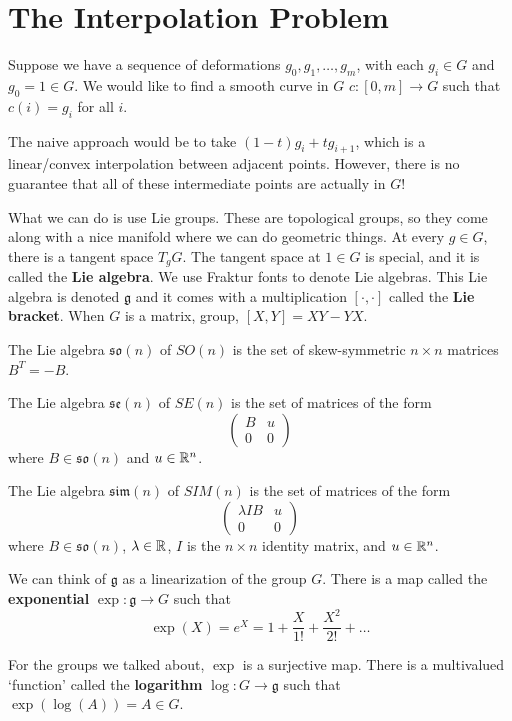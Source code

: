 \section*{The Interpolation Problem}

Suppose we have a sequence of deformations $g_0,g_1,\dots,g_m$, with each $g_i\in G$ and $g_0=1\in G$.  We would like to find a smooth curve in $G$ $c:[0,m]\rightarrow G$ such that $c(i)=g_i$ for all $i$.

The naive approach would be to take $(1-t)g_i + tg_{i+1}$, which is a linear/convex interpolation between adjacent points.  However, there is no guarantee that all of these intermediate points are actually in $G$!

What we can do is use Lie groups.  These are topological groups, so they come along with a nice manifold where we can do geometric things.  At every $g\in G$, there is a tangent space $T_gG$.  The tangent space at $1\in G$ is special, and it is called the \textbf{Lie algebra}.  We use Fraktur fonts to denote Lie algebras.  This Lie algebra is denoted $\mathfrak{g}$ and it comes with a multiplication $\left[\cdot,\cdot\right]$ called the \textbf{Lie bracket}.  When $G$ is a matrix, group, $\left[X,Y\right]=XY-YX$.

The Lie algebra $\mathfrak{so}(n)$ of $SO(n)$ is the set of skew-symmetric $n\times n$ matrices $B^T=-B$.

The Lie algebra $\mathfrak{se}(n)$ of $SE(n)$ is the set of matrices of the form
$$\begin{pmatrix}
B&u\\0&0
\end{pmatrix}$$ where $B\in \mathfrak{so}(n)$ and $u\in \mathbb{R}^n$.

The Lie algebra $\mathfrak{sim}(n)$ of $SIM(n)$ is the set of matrices of the form
$$\begin{pmatrix}
\lambda I B&u\\0&0
\end{pmatrix}$$ where $B\in \mathfrak{so}(n)$, $\lambda\in \mathbb{R}$, $I$ is the $n\times n$ identity matrix, and $u\in \mathbb{R}^n$.

We can think of $\mathfrak{g}$ as a linearization of the group $G$.  There is a map called the \textbf{exponential} $\exp: \mathfrak{g}\rightarrow G$ such that $$\exp(X) = e^X = 1+\frac{X}{1!}+\frac{X^2}{2!}+\dots$$

For the groups we talked about, $\exp$ is a surjective map.  There is a multivalued `function' called the \textbf{logarithm} $\log:G\rightarrow \mathfrak{g}$ such that $\exp(\log(A))=A\in G$.

